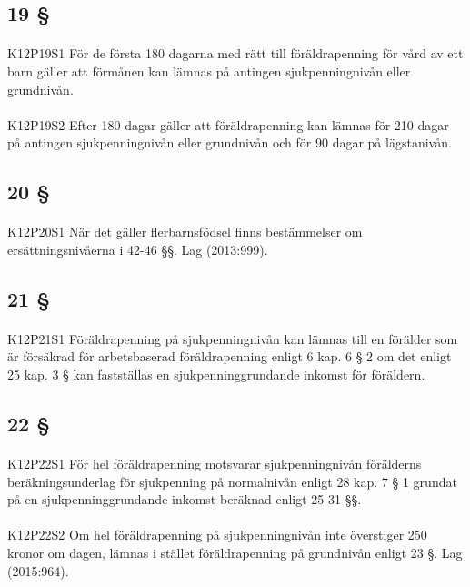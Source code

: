 \documentclass[a4paper,notitlepage,openany,10pt]{book}
\begin{document}
\subsection*{19 §}
\paragraph*{}
{\tiny K12P19S1}
För de första 180 dagarna med rätt till föräldrapenning för vård av ett barn gäller att förmånen kan lämnas på antingen sjukpenningnivån eller grundnivån.
\paragraph*{}
{\tiny K12P19S2}
Efter 180 dagar gäller att föräldrapenning kan lämnas för 210 dagar på antingen sjukpenningnivån eller grundnivån och för 90 dagar på lägstanivån.
\subsection*{20 §}
\paragraph*{}
{\tiny K12P20S1}
När det gäller flerbarnsfödsel finns bestämmelser om ersättningsnivåerna i 42-46 §§.
Lag (2013:999).
\subsection*{21 §}
\paragraph*{}
{\tiny K12P21S1}
Föräldrapenning på sjukpenningnivån kan lämnas till en förälder som är försäkrad för arbetsbaserad föräldrapenning enligt 6 kap. 6 § 2 om det enligt 25 kap. 3 § kan fastställas en sjukpenninggrundande inkomst för föräldern.
\subsection*{22 §}
\paragraph*{}
{\tiny K12P22S1}
För hel föräldrapenning motsvarar sjukpenningnivån förälderns beräkningsunderlag för sjukpenning på normalnivån enligt 28 kap. 7 § 1 grundat på en sjukpenninggrundande inkomst beräknad enligt 25-31 §§.
\paragraph*{}
{\tiny K12P22S2}
Om hel föräldrapenning på sjukpenningnivån inte överstiger 250 kronor om dagen, lämnas i stället föräldrapenning på grundnivån enligt 23 §.
Lag (2015:964).
\end{document}
